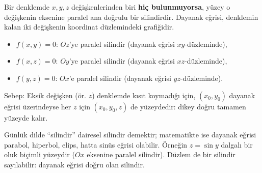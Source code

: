 \begin{teorem}
Bir denklemde $x,y,z$ değişkenlerinden biri \textbf{hiç bulunmuyorsa}, yüzey o değişkenin eksenine paralel ana doğrulu bir silindirdir. Dayanak eğrisi, denklemin kalan iki değişkenin koordinat düzlemindeki grafiğidir.
\begin{itemize}
  \item $f(x,y)=0$: $Oz$'ye paralel silindir (dayanak eğrisi $xy$-düzleminde),
  \item $f(x,z)=0$: $Oy$'ye paralel silindir (dayanak eğrisi $xz$-düzleminde),
  \item $f(y,z)=0$: $Ox$'e paralel silindir (dayanak eğrisi $yz$-düzleminde).
\end{itemize}
Sebep: Eksik değişken (ör. $z$) denklemde kısıt koymadığı için, $(x_0,y_0)$ dayanak eğrisi üzerindeyse her $z$ için $(x_0,y_0,z)$ de yüzeydedir: dikey doğru tamamen yüzeyde kalır.
\end{teorem}

\begin{center}
\qquad
{}
\end{center}

\begin{bilgi}
Günlük dilde ``silindir'' dairesel silindir demektir; matematikte ise dayanak eğrisi parabol, hiperbol, elips, hatta sinüs eğrisi olabilir. Örneğin $z=\sin y$ dalgalı bir oluk biçimli yüzeydir ($Ox$ eksenine paralel silindir). Düzlem de bir silindir sayılabilir: dayanak eğrisi doğru olan silindir.
\end{bilgi}

